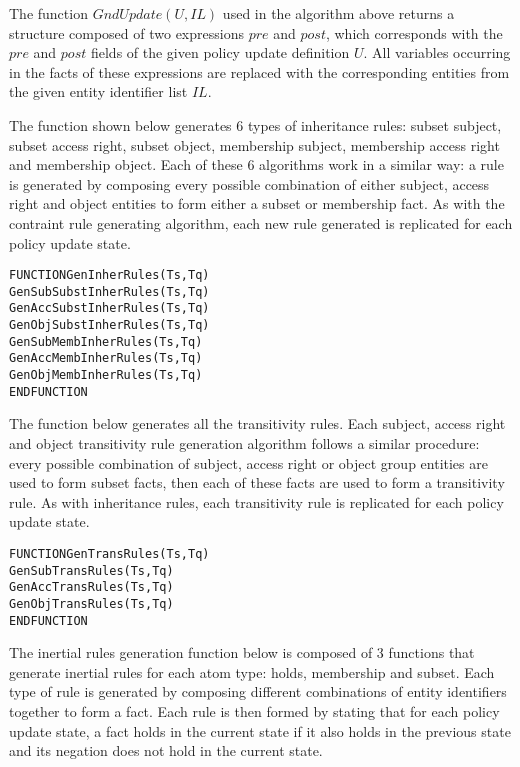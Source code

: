 \documentclass[glov2,twocolumn,final]{svjour2}
\newenvironment{vverbatim}
  {\begin{alltt}}
  {\vspace{-\baselineskip}\end{alltt}}
\begin{document}
          The function $GndUpdate(U, IL)$ used in the algorithm above returns
          a structure composed of two expressions $pre$ and $post$, which
          corresponds with the $pre$ and $post$ fields of the given policy
          update definition $U$. All variables occurring in the facts of these
          expressions are replaced with the corresponding entities from the
          given entity identifier list $IL$.

          The function shown below generates 6 types of inheritance rules:
          subset subject, subset access right, subset object, membership
          subject, membership access right and membership object. Each of
          these 6 algorithms work in a similar way: a rule is generated by
          composing every possible combination of either subject, access right
          and object entities to form either a subset or membership fact. As
          with the contraint rule generating algorithm, each new rule
          generated is replicated for each policy update state.

          \begin{vverbatim}
FUNCTION GenInherRules(Ts, Tq)
  GenSubSubstInherRules(Ts, Tq)
  GenAccSubstInherRules(Ts, Tq)
  GenObjSubstInherRules(Ts, Tq)
  GenSubMembInherRules(Ts, Tq)
  GenAccMembInherRules(Ts, Tq)
  GenObjMembInherRules(Ts, Tq)
ENDFUNCTION
          \end{vverbatim}

          The function below generates all the transitivity rules. Each
          subject, access right and object transitivity rule generation
          algorithm follows a similar procedure: every possible combination of
          subject, access right or object group entities are used to form
          subset facts, then each of these facts are used to form a
          transitivity rule. As with inheritance rules, each transitivity rule
          is replicated for each policy update state.

          \begin{vverbatim}
FUNCTION GenTransRules(Ts, Tq)
  GenSubTransRules(Ts, Tq)
  GenAccTransRules(Ts, Tq)
  GenObjTransRules(Ts, Tq)
ENDFUNCTION
          \end{vverbatim}

          The inertial rules generation function below is composed of 3
          functions that generate inertial rules for each atom type: holds,
          membership and subset. Each type of rule is generated by composing
          different combinations of entity identifiers together to form a fact.
          Each rule is then formed by stating that for each policy update
          state, a fact holds in the current state if it also holds in the
          previous state and its negation does not hold in the current state.
\end{document}
